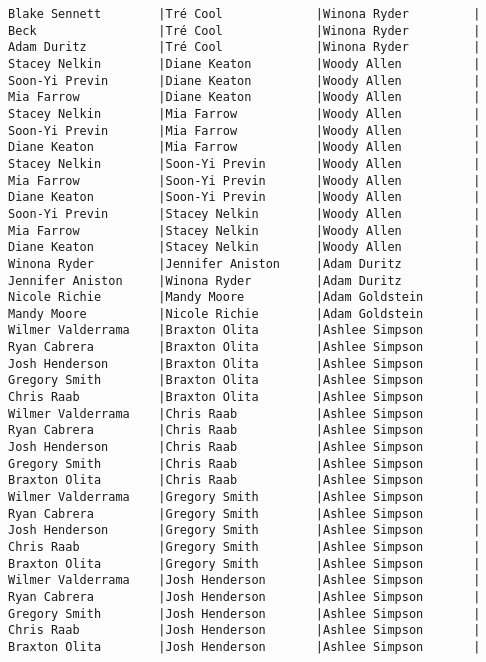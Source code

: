\documentclass{article}
\begin{document}
\begin{verbatim}
Blake Sennett        |Tré Cool             |Winona Ryder         |
Beck                 |Tré Cool             |Winona Ryder         |
Adam Duritz          |Tré Cool             |Winona Ryder         |
Stacey Nelkin        |Diane Keaton         |Woody Allen          |
Soon-Yi Previn       |Diane Keaton         |Woody Allen          |
Mia Farrow           |Diane Keaton         |Woody Allen          |
Stacey Nelkin        |Mia Farrow           |Woody Allen          |
Soon-Yi Previn       |Mia Farrow           |Woody Allen          |
Diane Keaton         |Mia Farrow           |Woody Allen          |
Stacey Nelkin        |Soon-Yi Previn       |Woody Allen          |
Mia Farrow           |Soon-Yi Previn       |Woody Allen          |
Diane Keaton         |Soon-Yi Previn       |Woody Allen          |
Soon-Yi Previn       |Stacey Nelkin        |Woody Allen          |
Mia Farrow           |Stacey Nelkin        |Woody Allen          |
Diane Keaton         |Stacey Nelkin        |Woody Allen          |
Winona Ryder         |Jennifer Aniston     |Adam Duritz          |
Jennifer Aniston     |Winona Ryder         |Adam Duritz          |
Nicole Richie        |Mandy Moore          |Adam Goldstein       |
Mandy Moore          |Nicole Richie        |Adam Goldstein       |
Wilmer Valderrama    |Braxton Olita        |Ashlee Simpson       |
Ryan Cabrera         |Braxton Olita        |Ashlee Simpson       |
Josh Henderson       |Braxton Olita        |Ashlee Simpson       |
Gregory Smith        |Braxton Olita        |Ashlee Simpson       |
Chris Raab           |Braxton Olita        |Ashlee Simpson       |
Wilmer Valderrama    |Chris Raab           |Ashlee Simpson       |
Ryan Cabrera         |Chris Raab           |Ashlee Simpson       |
Josh Henderson       |Chris Raab           |Ashlee Simpson       |
Gregory Smith        |Chris Raab           |Ashlee Simpson       |
Braxton Olita        |Chris Raab           |Ashlee Simpson       |
Wilmer Valderrama    |Gregory Smith        |Ashlee Simpson       |
Ryan Cabrera         |Gregory Smith        |Ashlee Simpson       |
Josh Henderson       |Gregory Smith        |Ashlee Simpson       |
Chris Raab           |Gregory Smith        |Ashlee Simpson       |
Braxton Olita        |Gregory Smith        |Ashlee Simpson       |
Wilmer Valderrama    |Josh Henderson       |Ashlee Simpson       |
Ryan Cabrera         |Josh Henderson       |Ashlee Simpson       |
Gregory Smith        |Josh Henderson       |Ashlee Simpson       |
Chris Raab           |Josh Henderson       |Ashlee Simpson       |
Braxton Olita        |Josh Henderson       |Ashlee Simpson       |

\end{verbatim}
\end{document}
